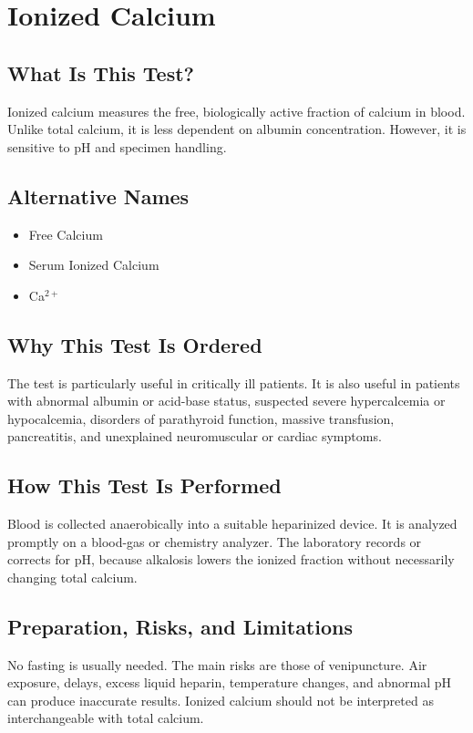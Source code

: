 \chapter{Ionized Calcium}

\section*{What Is This Test?}
Ionized calcium measures the free, biologically active fraction of calcium in blood. Unlike total calcium, it is less dependent on albumin concentration. However, it is sensitive to pH and specimen handling.

\section*{Alternative Names}
\begin{itemize}
  \item Free Calcium
  \item Serum Ionized Calcium
  \item Ca$^{2+}$
\end{itemize}
\section*{Why This Test Is Ordered}
The test is particularly useful in critically ill patients. It is also useful in patients with abnormal albumin or acid-base status, suspected severe hypercalcemia or hypocalcemia, disorders of parathyroid function, massive transfusion, pancreatitis, and unexplained neuromuscular or cardiac symptoms.

\section*{How This Test Is Performed}
Blood is collected anaerobically into a suitable heparinized device. It is analyzed promptly on a blood-gas or chemistry analyzer. The laboratory records or corrects for pH, because alkalosis lowers the ionized fraction without necessarily changing total calcium.

\section*{Preparation, Risks, and Limitations}
No fasting is usually needed. The main risks are those of venipuncture. Air exposure, delays, excess liquid heparin, temperature changes, and abnormal pH can produce inaccurate results. Ionized calcium should not be interpreted as interchangeable with total calcium.

